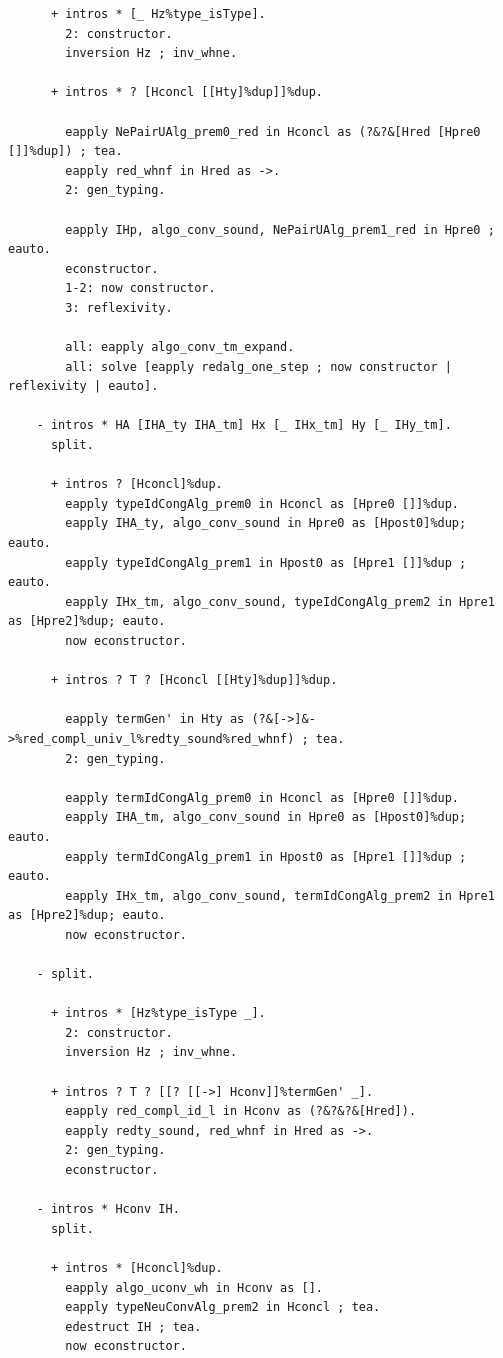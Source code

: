 \begin{lstlisting}
      + intros * [_ Hz%type_isType].
        2: constructor.
        inversion Hz ; inv_whne.

      + intros * ? [Hconcl [[Hty]%dup]]%dup.

        eapply NePairUAlg_prem0_red in Hconcl as (?&?&[Hred [Hpre0 []]%dup]) ; tea.
        eapply red_whnf in Hred as ->.
        2: gen_typing.

        eapply IHp, algo_conv_sound, NePairUAlg_prem1_red in Hpre0 ; eauto.
        econstructor.
        1-2: now constructor.
        3: reflexivity.

        all: eapply algo_conv_tm_expand.
        all: solve [eapply redalg_one_step ; now constructor | reflexivity | eauto].
        
    - intros * HA [IHA_ty IHA_tm] Hx [_ IHx_tm] Hy [_ IHy_tm].
      split.

      + intros ? [Hconcl]%dup.
        eapply typeIdCongAlg_prem0 in Hconcl as [Hpre0 []]%dup.
        eapply IHA_ty, algo_conv_sound in Hpre0 as [Hpost0]%dup; eauto.
        eapply typeIdCongAlg_prem1 in Hpost0 as [Hpre1 []]%dup ; eauto. 
        eapply IHx_tm, algo_conv_sound, typeIdCongAlg_prem2 in Hpre1 as [Hpre2]%dup; eauto.
        now econstructor.

      + intros ? T ? [Hconcl [[Hty]%dup]]%dup.

        eapply termGen' in Hty as (?&[->]&->%red_compl_univ_l%redty_sound%red_whnf) ; tea.
        2: gen_typing.

        eapply termIdCongAlg_prem0 in Hconcl as [Hpre0 []]%dup.
        eapply IHA_tm, algo_conv_sound in Hpre0 as [Hpost0]%dup; eauto.
        eapply termIdCongAlg_prem1 in Hpost0 as [Hpre1 []]%dup ; eauto. 
        eapply IHx_tm, algo_conv_sound, termIdCongAlg_prem2 in Hpre1 as [Hpre2]%dup; eauto.
        now econstructor.

    - split.
  
      + intros * [Hz%type_isType _].
        2: constructor.
        inversion Hz ; inv_whne.

      + intros ? T ? [[? [[->] Hconv]]%termGen' _].
        eapply red_compl_id_l in Hconv as (?&?&?&[Hred]).
        eapply redty_sound, red_whnf in Hred as ->.
        2: gen_typing.
        econstructor.
      
    - intros * Hconv IH.
      split.
      
      + intros * [Hconcl]%dup.
        eapply algo_uconv_wh in Hconv as [].
        eapply typeNeuConvAlg_prem2 in Hconcl ; tea.
        edestruct IH ; tea.
        now econstructor.


\end{lstlisting}
